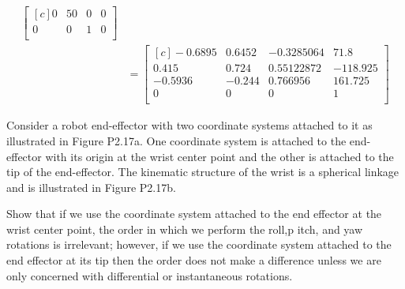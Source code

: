 \documentclass[onecolumn,10pt]{jhwhw}
\begin{document}
\begin{align*}
\begin{bmatrix*}[c]
0    & 50  & 0  & 0    \\
0    & 0   & 1  & 0    \\
\end{bmatrix*} \\
&=
\begin{bmatrix*}[c]
-0.6895    &    0.6452    &   -0.3285064 &   71.8   \\
 0.415     &    0.724     &    0.55122872& -118.925 \\
-0.5936    &   -0.244     &    0.766956  &  161.725 \\
 0         &    0         &    0         &    1     \\
\end{bmatrix*}
\end{align*}

\clearpage

\problem{}
Consider a robot end-effector with two coordinate systems attached to it as illustrated in Figure P2.17a. One coordinate system is attached to the end-effector with its origin at the wrist center point and the other is attached to the tip of the end-effector. The kinematic structure of the wrist is a spherical linkage and is illustrated in Figure P2.17b.

Show that if we use the coordinate system attached to the end effector at the wrist center point, the order in which we perform the roll,p itch, and yaw rotations is irrelevant; however, if we use the coordinate system attached to the end effector at its tip then the order does not make a difference unless we are only concerned with differential or instantaneous rotations.
\end{document}
